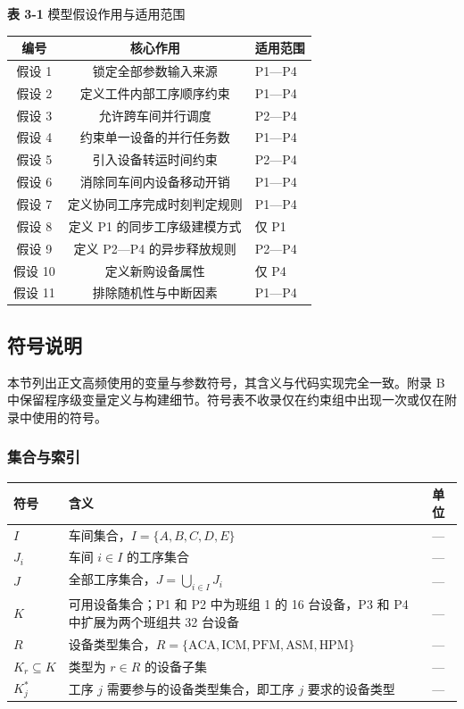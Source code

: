 \documentclass[UTF8,a4paper,12pt]{ctexart}
\begin{document}
\begin{center}
\textbf{表 3-1} 模型假设作用与适用范围
\begin{tabular}{ccl}
\toprule
编号 & 核心作用 & 适用范围 \\
\midrule
假设 1 & 锁定全部参数输入来源 & P1—P4 \\
假设 2 & 定义工件内部工序顺序约束 & P1—P4 \\
假设 3 & 允许跨车间并行调度 & P2—P4 \\
假设 4 & 约束单一设备的并行任务数 & P1—P4 \\
假设 5 & 引入设备转运时间约束 & P2—P4 \\
假设 6 & 消除同车间内设备移动开销 & P1—P4 \\
假设 7 & 定义协同工序完成时刻判定规则 & P1—P4 \\
假设 8 & 定义 P1 的同步工序级建模方式 & 仅 P1 \\
假设 9 & 定义 P2—P4 的异步释放规则 & P2—P4 \\
假设 10 & 定义新购设备属性 & 仅 P4 \\
假设 11 & 排除随机性与中断因素 & P1—P4 \\
\bottomrule
\end{tabular}
\end{center}

\subsection{符号说明}
本节列出正文高频使用的变量与参数符号，其含义与代码实现完全一致。附录 B 中保留程序级变量定义与构建细节。符号表不收录仅在约束组中出现一次或仅在附录中使用的符号。

\subsubsection{集合与索引}
\begin{center}
\begin{tabular}{lll}
\toprule
符号 & 含义 & 单位 \\
\midrule
$I$ & 车间集合，$I = \{A, B, C, D, E\}$ & — \\
$J_i$ & 车间 $i \in I$ 的工序集合 & — \\
$J$ & 全部工序集合，$J = \bigcup_{i \in I} J_i$ & — \\
$K$ & 可用设备集合；P1 和 P2 中为班组 1 的 16 台设备，P3 和 P4 中扩展为两个班组共 32 台设备 & — \\
$R$ & 设备类型集合，$R = \{\text{ACA}, \text{ICM}, \text{PFM}, \text{ASM}, \text{HPM}\}$ & — \\
$K_r \subseteq K$ & 类型为 $r \in R$ 的设备子集 & — \\
$K_j^*$ & 工序 $j$ 需要参与的设备类型集合，即工序 $j$ 要求的设备类型 & — \\
\bottomrule
\end{tabular}
\end{center}
\end{document}
